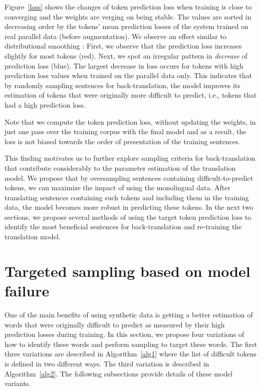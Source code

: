 Figure~\ref{loss} shows the changes of token prediction loss %
when training is close to converging and the weights are verging on being stable.
The values are sorted in decreasing order by the tokens' mean prediction losses of the system trained on real parallel data (before augmentation).
%
We observe an effect similar to distributional smoothing \citep{chen1996empirical}: 
First, we observe that the prediction loss increases slightly for most tokens (red).
Next, we spot an irregular pattern in \textit{decrease} of prediction loss (blue).
The largest decrease in loss occurs for tokens with high prediction loss values when trained on the parallel data only. 
This indicates that by randomly sampling sentences for back-translation, the model improves its estimation of tokens that were originally more difficult to predict, i.e., tokens that had a high prediction loss. 

Note that we compute the token prediction loss, without updating the weights, in just one pass over the training corpus with the final model and as a result, the loss is not biased towards the order of presentation of the training sentences.

This finding motivates us to further explore sampling criteria for back-translation that contribute considerably to the parameter estimation of the translation model. 
We propose that by oversampling sentences containing difficult-to-predict tokens, we can maximize the impact of using the monolingual data.
After translating sentences containing such tokens and including them in the training data, the model becomes more robust in predicting these tokens.
In the next two sections, we propose several methods of using the target token prediction loss to identify the most beneficial sentences for back-translation and re-training the translation model. 


\section{Targeted sampling based on model failure} \label{bttarget}

One of the main benefits of using synthetic data is getting a better estimation of words that were originally difficult to predict as measured by their high prediction losses during training.
In this section, we propose four variations of how to identify these words and perform sampling to target these words.
The first three variations are described in Algorithm~\ref{alg1} where the list of difficult tokens is defined in two different ways.
The third variation is described in Algorithm~\ref{alg2}. 
The following subsections provide details of these model variants. 

